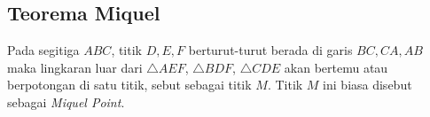 \subsection{Teorema Miquel}
    Pada segitiga $ABC$, titik $D,E,F$ berturut-turut berada di garis $BC,CA,AB$ maka lingkaran luar dari $\triangle AEF$, $\triangle  BDF$, $\triangle CDE$ akan bertemu atau berpotongan di satu titik, sebut sebagai titik $M$. Titik $M$ ini biasa disebut sebagai \textit{Miquel Point}.